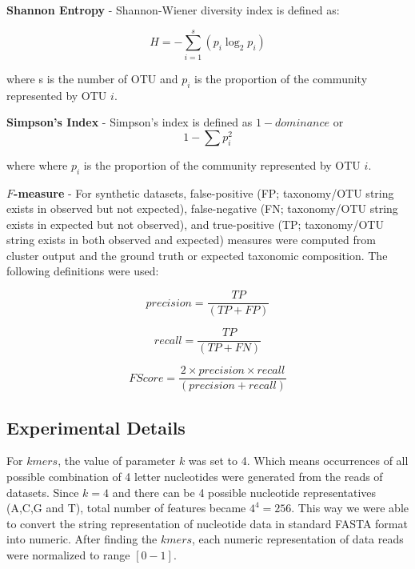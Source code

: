 \documentclass[10pt, conference, compsocconf]{IEEEtran}
\begin{document}
\hspace*{4mm}\textbf{Shannon Entropy} - Shannon-Wiener diversity index is defined as:

\begin{equation}
H={-} \sum_{i=1}^{s} \left( p_i\log_2p_i \right)
\end{equation}

where s is the number of OTU and $p_i$ is the proportion of the community represented by OTU $i$.

\hspace*{4mm}\textbf{Simpson's Index} - Simpson’s index is defined as ${1-dominance}$ or
\begin{equation}
1 - \sum p_i^2
\end{equation}

where where $p_i$ is the proportion of the community represented by OTU $i$.

\hspace*{4mm}\textbf{$F$-measure} - For synthetic datasets, false-positive (FP; taxonomy/OTU string exists in observed but not expected), false-negative (FN; taxonomy/OTU string exists in expected but not observed), and true-positive (TP; taxonomy/OTU string exists in both observed and expected) measures were computed from cluster output and the ground truth or expected taxonomic composition. The following definitions were used:

\begin{equation}
precision = \frac{TP}{(TP + FP)}
\end{equation}

\begin{equation}
recall = \frac{TP}{(TP + FN)}
\end{equation}

\begin{equation}
F Score = \frac{2 \times precision \times recall}{(precision + recall)}
\end{equation}

\subsection{Experimental Details}
For $kmers$, the value of parameter $k$ was set to 4. Which means occurrences of all possible combination of 4 letter nucleotides were generated from the reads of datasets. Since $k=4$ and there can be 4 possible nucleotide representatives (A,C,G and T), total number of features became $4^4=256$. This way we were able to convert the string representation of nucleotide data in standard FASTA format into numeric. After finding the $kmers$, each numeric representation of data reads were normalized to range $\left[0-1\right]$.
\end{document}
